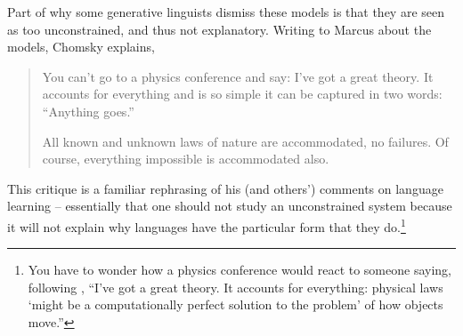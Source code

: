 \documentclass[output=paper,colorlinks,citecolor=brown
]{langscibook}
\begin{document}
Part of why some generative linguists dismiss these models is that they are seen as too unconstrained, and thus not explanatory. Writing to Marcus about the models, Chomsky explains, 
\begin{quote}
You can’t go to a physics conference and say: I’ve got a great theory.  It accounts for everything and is so simple it can be captured in two words: “Anything goes.”
    
All known and unknown laws of nature are accommodated, no failures.  Of course, everything impossible is accommodated also.
\end{quote}
This critique is a familiar rephrasing of his (and others') comments on language learning -- essentially that one should not study an unconstrained system because it will not explain why languages have the particular form that they do.\footnote{ You have to wonder how a physics conference would react to someone saying, following  \citet{lasnik2002minimalist}, ``I've got a great theory. It accounts for everything: physical laws `might be a computationally perfect solution to the problem' of how objects move.''}
\end{document}
